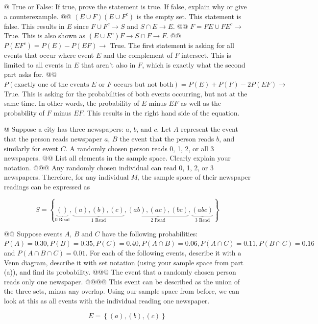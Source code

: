 \documentclass[10pt]{article}
\begin{document}
\begin{easylist}[enumerate]
    @ True or False: If true, prove the statement is true. If false, explain why or give a counterexample.
    @@ $(E \cup F)(E \cup F^c)$ is the empty set. This statement is false. This results in $E$ since $F \cup F^c \to S$ and $S \cap E \to E$.
    @@ $F = FE \cup FE^c \to $ True. This is also shown as $ ( E \cup E^c ) F \to S \cap F \to F$.
    @@ $P(EF^c) = P(E) - P(EF) \to $ True. The first statement is asking for all events that occur where event $E$ and the complement of $F$ intersect. This is limited to all events in $E$ that aren't also in $F$, which is exactly what the second part asks for.
    @@ $P(\text{exactly one of the events $E$ or $F$ occurs but not both}) = P(E) + P(F ) - 2P(EF) \to$ True. This is asking for the probabilities of both events occurring, but not at the same time. In other words, the probability of $E$ minus $EF$ as well as the probability of $F$ minus $EF$. This results in the right hand side of the equation.

    @ Suppose a city has three newspapers: $a$, $b$, and $c$. Let $A$ represent the event that the person reads newspaper $a$, $B$ the event that the person reads $b$, and similarly for event $C$. A randomly chosen person reads 0, 1, 2, or all 3 newspapers.
    @@ List all elements in the sample space. Clearly explain your notation.
    @@@ Any randomly chosen individual can read 0, 1, 2, or 3 newspapers. Therefore, for any individual $M$, the sample space of their newspaper readings can be expressed as

    \[ S = \left\{
                \underbrace{()}_{\text{0 Read}},
                \underbrace{(a), (b), (c)}_{\text{1 Read}},
                \underbrace{(ab), (ac), (bc)}_{\text{2 Read}},
                \underbrace{(abc)}_{\text{3 Read}}
        \right\} \]

    @@ Suppose events $A$, $B$ and $C$ have the following probabilities: $P(A) = 0.30, P(B) = 0.35, P(C) = 0.40, P(A \cap B) = 0.06, P(A \cap C) = 0.11, P(B \cap C) = 0.16$ and $P(A \cap B \cap C) = 0.01$. For each of the following events, describe it with a Venn diagram, describe it with set notation (using your sample space from part (a)), and find its probability.
    @@@ The event that a randomly chosen person reads only one newspaper.
    @@@@ This event can be described as the union of the three sets, minus any overlap. Using our sample space from before, we can look at this as all events with the individual reading one newspaper.

        \[ E = \left\{ (a), (b), (c) \right\} \]


\end{easylist}
\end{document}
